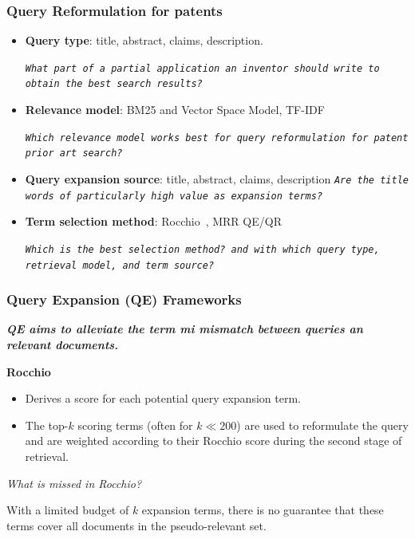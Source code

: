 \documentclass[xcolor=x11names,compress]{beamer}
\renewcommand{\(}{\begin{columns}}
\renewcommand{\)}{\end{columns}}
\newcommand{\<}[1]{\begin{column}{#1}}
\renewcommand{\>}{\end{column}}
\begin{document}
\begin{frame}
\frametitle{Query Reformulation for patents}

\begin{itemize}
\item {\color{DeepSkyBlue4}\textbf{Query type}}: title, abstract, claims, description.

{\small \textit{\texttt{What part of a partial application an inventor
should write to obtain the best search results?}}}

\item {\color{DeepSkyBlue4}\textbf{Relevance model}}: BM25 and Vector Space Model, TF-IDF~\citep{Salton1975}

{\small \textit{\texttt{Which relevance model works best for query reformulation
for patent prior art search? }}}

\item {\color{DeepSkyBlue4}\textbf{Query expansion source}}:  title, abstract,
claims, description
{\small \texttt{\textit{Are the title words of particularly high value as expansion terms? }}}

\item {\color{DeepSkyBlue4}\textbf{Term selection method}}: Rocchio~\citep{Salton1971}, 
MRR QE/QR 

{\small \textit{\texttt{Which is the best selection method? and with which query type, retrieval model, and term source? }}}
\end{itemize}
\end{frame}


\begin{frame}
\frametitle{Query Expansion (QE) Frameworks}

{\color{DeepSkyBlue4}\textit{\textbf{QE aims to alleviate the term mi mismatch between queries an relevant documents.}}}

\vspace{0.3cm}

\textbf{Rocchio}~\citep{Salton1971}

\begin{itemize}
\item Derives a score for each potential query expansion term.
\item The top-$k$ scoring terms (often for $k\ll200$) are used to reformulate the query and are
weighted according to their Rocchio score during the second stage
of retrieval.
\end{itemize}

{\color{DeepSkyBlue4}\textit{What is missed in Rocchio?}}

\vspace{0.3cm}
With a limited budget of $k$ expansion terms, there is no guarantee that these terms cover all documents in the pseudo-relevant set.
\end{frame}
\end{document}

